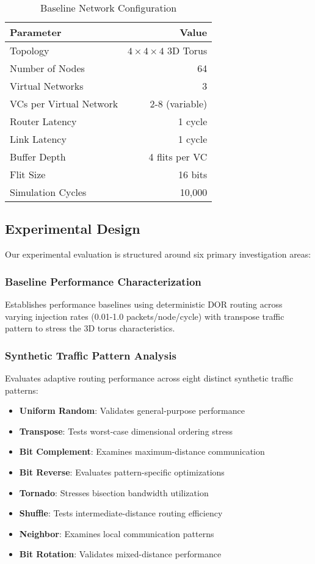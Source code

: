 \documentclass[a4paper,12pt]{article}
\begin{document}
\begin{table}[H]
\centering
\caption{Baseline Network Configuration}
\begin{tabular}{@{}lr@{}}
\toprule
\textbf{Parameter} & \textbf{Value} \\
\midrule
Topology & $4 \times 4 \times 4$ 3D Torus \\
Number of Nodes & 64 \\
Virtual Networks & 3 \\
VCs per Virtual Network & 2-8 (variable) \\
Router Latency & 1 cycle \\
Link Latency & 1 cycle \\
Buffer Depth & 4 flits per VC \\
Flit Size & 16 bits \\
Simulation Cycles & 10,000 \\
\bottomrule
\end{tabular}
\end{table}

\subsection{Experimental Design}

Our experimental evaluation is structured around six primary investigation areas:

\subsubsection{Baseline Performance Characterization}
Establishes performance baselines using deterministic DOR routing across varying injection rates (0.01-1.0 packets/node/cycle) with transpose traffic pattern to stress the 3D torus characteristics.

\subsubsection{Synthetic Traffic Pattern Analysis}
Evaluates adaptive routing performance across eight distinct synthetic traffic patterns:
\begin{itemize}
    \item \textbf{Uniform Random}: Validates general-purpose performance
    \item \textbf{Transpose}: Tests worst-case dimensional ordering stress
    \item \textbf{Bit Complement}: Examines maximum-distance communication
    \item \textbf{Bit Reverse}: Evaluates pattern-specific optimizations
    \item \textbf{Tornado}: Stresses bisection bandwidth utilization
    \item \textbf{Shuffle}: Tests intermediate-distance routing efficiency
    \item \textbf{Neighbor}: Examines local communication patterns
    \item \textbf{Bit Rotation}: Validates mixed-distance performance
\end{itemize}
\end{document}
